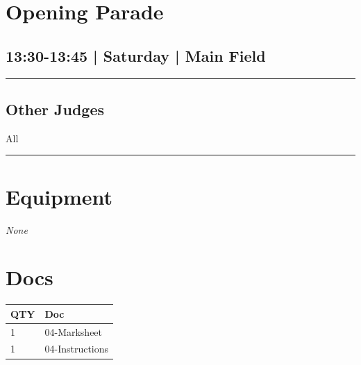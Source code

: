 \documentclass[10pt, A5]{article}
\begin{document}
        \begin{framed}
        \begin{minipage}{\textwidth}

        \setcounter{section}{10}
        \section{Opening Parade}
        \subsection*{13:30-13:45 | Saturday | Main Field}

        \vspace{0.25cm}
        \hrule
        \vspace{0.25cm}


        \subsection*{Other Judges}
                    All

            \vspace{0.25cm}
        \hrule
        \vspace{0.25cm}

        \begin{multicols}{2}

		\section*{\faWrench \: Equipment}

				\textit{None}
		
		\vfill\null
		\columnbreak

			\section*{\faFile \: Docs}
		 	\begin{center}
			\begin{tabular}{p{2cm}p{4cm}}

			\textbf{QTY} & \textbf{Doc} \\\toprule
										1&04-Marksheet\\\midrule
										1&04-Instructions\\\midrule
							\end{tabular}
			\end{center}
	

		\vfill\null

		\end{multicols}
\end{minipage}
\end{framed}
\end{document}
